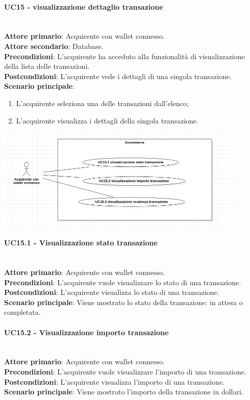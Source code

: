 \documentclass[a4paper, 12pt]{article}
\begin{document}
\paragraph{UC15 - visualizzazione dettaglio transazione}\\
\textbf{Attore primario}: Acquirente con wallet connesso.\\
\textbf{Attore secondario}: Database.\\
\textbf{Precondizioni}: L'acquirente ha acceduto alla funzionalità di visualizzazione della lista delle transazioni.\\
\textbf{Postcondizioni}: L'acquirente vede i dettagli di una singola transazione.\\
\textbf{Scenario principale}:
\begin{enumerate}
\item L'acquirente seleziona una delle transazioni dall'elenco;
\item L'acquirente visualizza i dettagli della singola transazione.
\end{enumerate}

\includegraphics[width=0.9\textwidth]{UC_ECA3}

\paragraph{UC15.1 - Visualizzazione stato transazione}\\
\textbf{Attore primario}: Acquirente con wallet connesso.\\
\textbf{Precondizioni}: L'acquirente vuole visualizzare lo stato di una transazione.\\
\textbf{Postcondizioni}: L'acquirente visualizza lo stato di una transazione.\\
\textbf{Scenario principale}: Viene mostrato lo stato della transazione: in attesa o completata.\\

\paragraph{UC15.2 - Visualizzazione importo transazione}\\
\textbf{Attore primario}: Acquirente con wallet connesso.\\
\textbf{Precondizioni}: L'acquirente vuole visualizzare l'importo di una transazione.\\
\textbf{Postcondizioni}: L'acquirente visualizza l'importo di una transazione.\\
\textbf{Scenario principale}: Viene mostrato l'importo della transazione in dollari.\\
\end{document}

